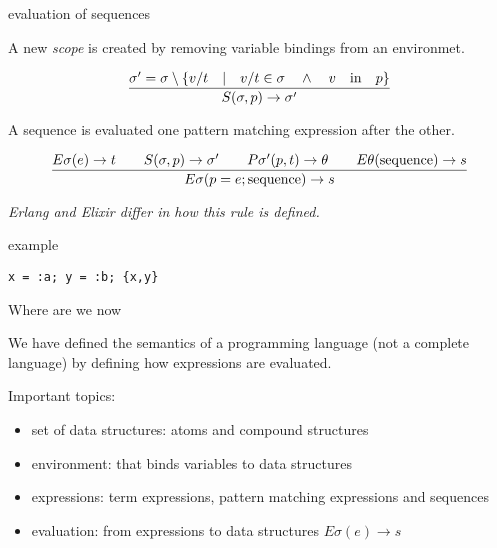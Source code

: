 \begin{frame}{evaluation of sequences}

  \pause  A new {\em scope} is created by removing variable bindings from an environmet.

  \vspace{10pt}\pause

$$\frac{\sigma' = \sigma \setminus \lbrace v/t \quad | \quad v/t \in \sigma \quad \wedge \quad  v \quad {\rm in} \quad p\rbrace}{S(\sigma, p) \rightarrow \sigma'}$$
  
\vspace{10pt}\pause

A sequence is evaluated one pattern matching expression after the other. 

$$\frac{   
  E\sigma(e) \rightarrow t
  \qquad S(\sigma, p) \rightarrow \sigma' 
  \qquad P\sigma'(p, t) \rightarrow \theta
  \qquad E\theta({\rm sequence}) \rightarrow s
}{E\sigma(p = e; {\rm sequence}) \rightarrow s}$$ 

\vfill
{\em Erlang and Elixir differ in how this rule is defined.}
\end{frame}

\begin{frame}{example}

   {\tt x = :a; y = :b; \{x,y\}}

\end{frame}

\begin{frame}{Where are we now}

We have defined the semantics of a programming language (not a
complete language) by defining how expressions are evaluated.

\vspace{20pt} 

\pause Important topics:

\vspace{10pt} 

\begin{itemize}
 \pause \item set of data structures: atoms and compound structures
 \pause \item environment: that binds variables to data structures
 \pause \item expressions: term expressions, pattern matching expressions and sequences
 \pause \item evaluation: from expressions to data structures $E\sigma(e) \rightarrow s$
\end{itemize}

\end{frame}

